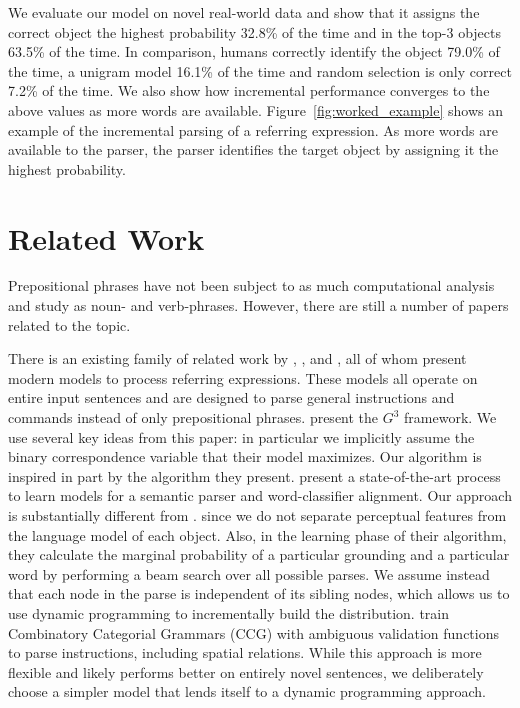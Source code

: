 \documentclass[conference]{IEEEtran}
\numberwithin{equation}{section}
\begin{document}
We evaluate our model on novel real-world data and show that it assigns the correct object the highest probability 32.8\% of the time and in the top-3 objects 63.5\% of the time. In comparison, humans correctly identify the object 79.0\% of the time, a unigram model 16.1\% of the time and random selection is only correct 7.2\% of the time. We also show how incremental performance converges to the above values as more words are available. Figure~\ref{fig:worked_example} shows an example of the incremental parsing of a referring expression. As more words are available to the parser, the parser identifies the target object by assigning it the highest probability.


\section{Related Work}

Prepositional phrases have not been subject to as much computational analysis and study as noun- and verb-phrases. However, there are still a number of papers related to the topic. 

There is an existing family of related work by \citet{tellex2011understanding}, \citet{UW_RSE_ICML2012}, and \citet{artzi2013weakly}, all of whom present modern models to process referring expressions. These models all operate on entire input sentences and are designed to parse general instructions and commands instead of only prepositional phrases. 
\citet{tellex2011understanding} present the $G^3$ framework. We use several key ideas from this paper: in particular we implicitly assume the binary correspondence variable that their model maximizes. Our algorithm is inspired in part by the algorithm they present.
\citet{UW_RSE_ICML2012} present a state-of-the-art process to learn models for a semantic parser and word-classifier alignment. Our approach is substantially different from \citeauthor{UW_RSE_ICML2012}. since we do not separate perceptual features from the language model of each object. Also, in the learning phase of their algorithm, they calculate the marginal probability of a particular grounding and a particular word by performing a beam search over all possible parses. We assume instead that each node in the parse is independent of its sibling nodes, which allows us to use dynamic programming to incrementally build the distribution.
\citet{artzi2013weakly} train Combinatory Categorial Grammars (CCG) with ambiguous validation functions to parse instructions, including spatial relations. While this approach is more flexible and likely performs better on entirely novel sentences, we deliberately choose a simpler model that lends itself to a dynamic programming approach.
\end{document}
